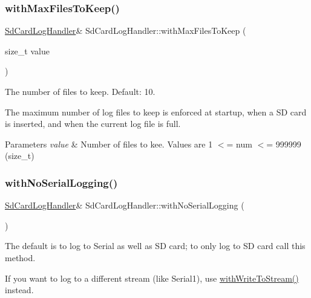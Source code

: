 \subsubsection{\texorpdfstring{with\+Max\+Files\+To\+Keep()}{withMaxFilesToKeep()}}
{\footnotesize\ttfamily \mbox{\hyperlink{class_sd_card_log_handler}{Sd\+Card\+Log\+Handler}}\& Sd\+Card\+Log\+Handler\+::with\+Max\+Files\+To\+Keep (\begin{DoxyParamCaption}\item[{size\+\_\+t}]{value }\end{DoxyParamCaption})\hspace{0.3cm}{\ttfamily [inline]}}



The number of files to keep. Default\+: 10. 

The maximum number of log files to keep is enforced at startup, when a SD card is inserted, and when the current log file is full.


\begin{DoxyParams}{Parameters}
{\em value} & Number of files to kee. Values are 1 $<$= num $<$= 999999 (size\+\_\+t) \\
\hline
\end{DoxyParams}
\mbox{\label{class_sd_card_log_handler_a4ca51820470fb98d58944126522d12dd}} 
\subsubsection{\texorpdfstring{with\+No\+Serial\+Logging()}{withNoSerialLogging()}}
{\footnotesize\ttfamily \mbox{\hyperlink{class_sd_card_log_handler}{Sd\+Card\+Log\+Handler}}\& Sd\+Card\+Log\+Handler\+::with\+No\+Serial\+Logging (\begin{DoxyParamCaption}{ }\end{DoxyParamCaption})\hspace{0.3cm}{\ttfamily [inline]}}



The default is to log to Serial as well as SD card; to only log to SD card call this method. 

If you want to log to a different stream (like Serial1), use \mbox{\hyperlink{class_sd_card_log_handler_aca341088fe42f1e1dcfbabfbce0da529}{with\+Write\+To\+Stream()}} instead. \mbox{\label{class_sd_card_log_handler_a761f6d348e72d349d31d07835fde5608}} 
